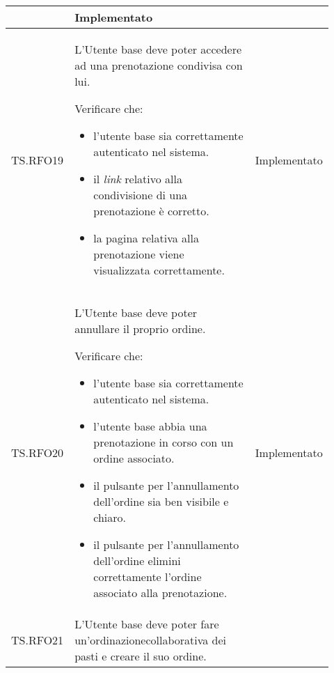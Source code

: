 \begin{longtable}{|p{0.10\linewidth}|p{0.70\linewidth}|p{0.12\linewidth}|}
\begin{itemize}
	\end{itemize}                                     &
	Implementato                                                                                                                                                            \\
	\hline
	TS.RFO19                                                                                                                        &
	L'Utente base deve poter accedere ad una prenotazione condivisa con lui.  \par
	Verificare che:
	\begin{itemize}
		\item l'utente base sia correttamente autenticato nel sistema.
		\item il \textit{link} relativo alla condivisione di una prenotazione è corretto.
		\item la pagina relativa alla prenotazione viene visualizzata correttamente.
	\end{itemize}                                               &
	Implementato                                                                                                                                                            \\
	\hline
	TS.RFO20                                                                                                                        &
	L'Utente base deve poter annullare il proprio ordine\g.\par
	Verificare che:
	\begin{itemize}
		\item l'utente base sia correttamente autenticato nel sistema.
		\item l'utente base abbia una prenotazione in corso con un ordine associato.
		\item il pulsante per l'annullamento dell'ordine sia ben visibile e chiaro.
		\item il pulsante per l'annullamento dell'ordine elimini correttamente l'ordine associato alla prenotazione.
	\end{itemize}                    &
	Implementato                                                                                                                                                            \\
	\hline
	TS.RFO21                                                                                                                        &
	L'Utente base deve poter fare un'ordinazione\g collaborativa dei pasti e creare il suo ordine.  \par

\end{longtable}
